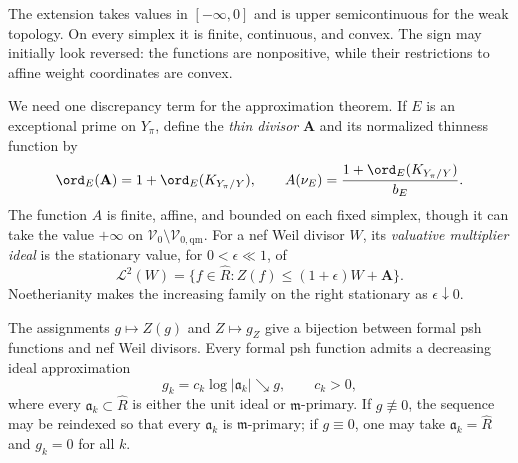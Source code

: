 The extension takes values in $[ -\infty,0]$ and is upper
semicontinuous for the weak topology.  On every simplex it is finite,
continuous, and convex.  The sign may initially look reversed: the
functions are nonpositive, while their restrictions to affine weight
coordinates are convex.

We need one discrepancy term for the approximation theorem.  If $E$ is an
exceptional prime on $Y_\pi$, define the \emph{thin divisor}
$\mathbf A$ and its normalized thinness function by
\[
 \ord_E(\mathbf A)=1+\ord_E(K_{Y_\pi/Y}),
 \qquad
 A(\nu_E)=\frac{1+\ord_E(K_{Y_\pi/Y})}{b_E}.
\]
The function $A$ is finite, affine, and bounded on each fixed simplex,
though it can take the value $+\infty$ on
$\mathcal V_0\setminus\mathcal V_{0,\mathrm{qm}}$.
For a nef Weil divisor $W$, its \emph{valuative multiplier ideal} is the
stationary value, for $0<\epsilon\ll1$, of
\[
 \mathcal L^2(W)
   =\{f\in\widehat R:
          Z(f)\leq(1+\epsilon)W+\mathbf A\}.
\]
Noetherianity makes the increasing family on the right stationary as
$\epsilon\downarrow0$.

\begin{theorem}\label{thm:local-nef-psh-equivalence}
The assignments $g\mapsto Z(g)$ and $Z\mapsto g_Z$ give a bijection
between formal psh functions and nef Weil divisors.  Every formal psh
function admits a decreasing ideal approximation
\[
                  g_k=c_k\log|\mathfrak a_k|\searrow g,
 \qquad c_k>0,
\tag{70.15}\label{eq:local-decreasing-ideal-approximation}
\]
where every $\mathfrak a_k\subset\widehat R$ is either the unit ideal or
$\mathfrak m$-primary.  If $g\not\equiv0$, the sequence may be reindexed
so that every $\mathfrak a_k$ is $\mathfrak m$-primary; if $g\equiv0$,
one may take $\mathfrak a_k=\widehat R$ and $g_k=0$ for all $k$.
\end{theorem}

